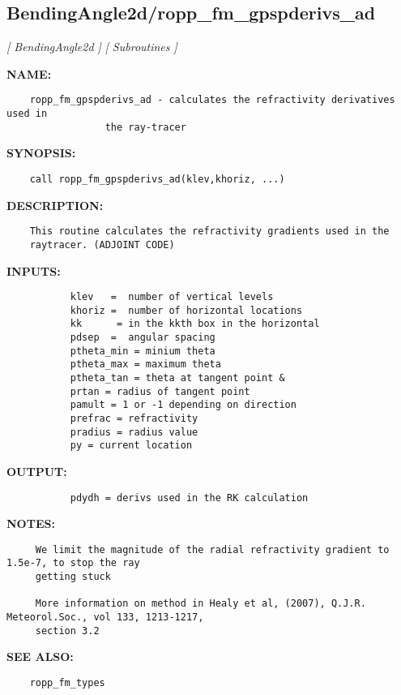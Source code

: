 \subsection{BendingAngle2d/ropp\_fm\_gpspderivs\_ad}
\textsl{[ BendingAngle2d ]}
\textsl{[ Subroutines ]}

\label{ch:robo14}
\label{ch:BendingAngle2d_ropp_fm_gpspderivs_ad}
\textbf{NAME:}\hspace{0.08in}\begin{Verbatim}
    ropp_fm_gpspderivs_ad - calculates the refractivity derivatives used in
                 the ray-tracer 
\end{Verbatim}
\textbf{SYNOPSIS:}\hspace{0.08in}\begin{Verbatim}
    call ropp_fm_gpspderivs_ad(klev,khoriz, ...)
\end{Verbatim}
\textbf{DESCRIPTION:}\hspace{0.08in}\begin{Verbatim}
    This routine calculates the refractivity gradients used in the
    raytracer. (ADJOINT CODE) 
\end{Verbatim}
\textbf{INPUTS:}\hspace{0.08in}\begin{Verbatim}
           klev   =  number of vertical levels
           khoriz =  number of horizontal locations
           kk      = in the kkth box in the horizontal
           pdsep  =  angular spacing
           ptheta_min = minium theta 
           ptheta_max = maximum theta 
           ptheta_tan = theta at tangent point & 
           prtan = radius of tangent point
           pamult = 1 or -1 depending on direction
           prefrac = refractivity
           pradius = radius value
           py = current location
\end{Verbatim}
\textbf{OUTPUT:}\hspace{0.08in}\begin{Verbatim}
           pdydh = derivs used in the RK calculation
\end{Verbatim}
\textbf{NOTES:}\hspace{0.08in}\begin{Verbatim}
     We limit the magnitude of the radial refractivity gradient to 1.5e-7, to stop the ray
     getting stuck 

     More information on method in Healy et al, (2007), Q.J.R. Meteorol.Soc., vol 133, 1213-1217, 
     section 3.2  
\end{Verbatim}
\textbf{SEE ALSO:}\hspace{0.08in}\begin{Verbatim}
    ropp_fm_types
\end{Verbatim}
